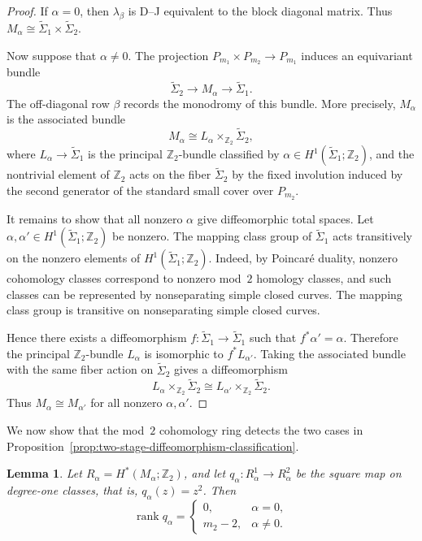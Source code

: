 \documentclass{amsart}
\newtheorem{lemma}[theorem]{Lemma}
\numberwithin{equation}{section}
\theoremstyle{definition}
\theoremstyle{remark}
\newcommand{\Z}{\mathbb Z}
\DeclareMathOperator{\rank}{rank}
\begin{document}
\begin{proof}
    If $\alpha=0$, then $\lambda_\beta$ is D--J equivalent to the block diagonal matrix.
    Thus $M_\alpha\cong \widetilde{\Sigma}_1\times \widetilde{\Sigma}_2$.
    
    Now suppose that $\alpha\ne0$.
    The projection $P_{m_1}\times P_{m_2}\to P_{m_1}$ induces an equivariant bundle
    $$
        \widetilde{\Sigma}_2\longrightarrow M_\alpha\longrightarrow \widetilde{\Sigma}_1.
    $$
    The off-diagonal row $\beta$ records the monodromy of this bundle. 
    More precisely, $M_\alpha$ is the associated bundle
    $$
        M_\alpha\cong L_\alpha\times_{\Z_2}\widetilde{\Sigma}_2,
    $$
    where $L_\alpha\to \widetilde{\Sigma}_1$ is the principal $\Z_2$-bundle classified by $\alpha\in H^1(\widetilde{\Sigma}_1;\Z_2)$, and the nontrivial element of $\Z_2$ acts on the fiber $\widetilde{\Sigma}_2$ by the fixed involution induced by the second generator of the standard small cover over $P_{m_2}$.
    
    It remains to show that all nonzero $\alpha$ give diffeomorphic total spaces.
    Let $\alpha,\alpha'\in H^1(\widetilde{\Sigma}_1;\Z_2)$ be nonzero. 
    The mapping class group of $\widetilde{\Sigma}_1$ acts transitively on the nonzero elements of $H^1(\widetilde{\Sigma}_1;\Z_2)$. 
    Indeed, by Poincar\'e duality, nonzero cohomology classes correspond to nonzero mod~$2$ homology classes, and such classes can be represented by nonseparating simple closed curves. 
    The mapping class group is transitive on nonseparating simple closed curves.
    
    Hence there exists a diffeomorphism $f\colon \widetilde{\Sigma}_1\to \widetilde{\Sigma}_1$ such that $f^\ast\alpha'=\alpha$.
    Therefore the principal $\Z_2$-bundle $L_\alpha$ is isomorphic to $f^\ast L_{\alpha'}$. 
    Taking the associated bundle with the same fiber action on $\widetilde{\Sigma}_2$ gives a diffeomorphism
    $$
        L_\alpha\times_{\Z_2}\widetilde{\Sigma}_2 \cong L_{\alpha'}\times_{\Z_2}\widetilde{\Sigma}_2.
    $$
    Thus $M_\alpha\cong M_{\alpha'}$ for all nonzero $\alpha,\alpha'$.
\end{proof}

We now show that the mod~$2$ cohomology ring detects the two cases in Proposition~\ref{prop:two-stage-diffeomorphism-classification}.

\begin{lemma}\label{lem:two-stage-square-rank}
    Let $R_\alpha=H^\ast(M_\alpha;\Z_2)$, and let $q_\alpha \colon R_\alpha^1\to R_\alpha^2$ be the square map on degree-one classes, that is, $q_\alpha(z)=z^2$. Then
    $$
        \rank q_\alpha = \begin{cases} 
            0, & \alpha=0,\\
            m_2 -2, & \alpha\ne0.
        \end{cases}
    $$
\end{lemma}
\end{document}
